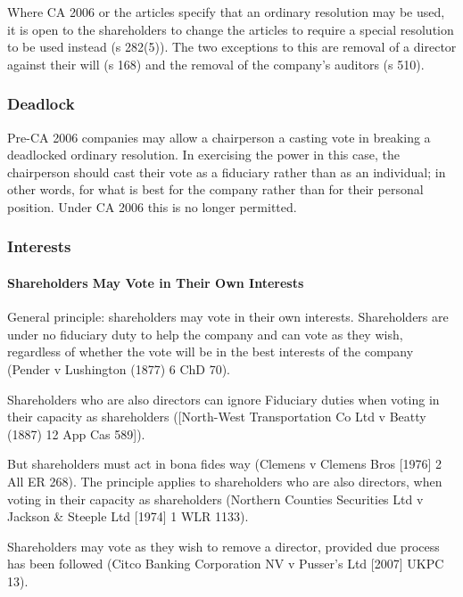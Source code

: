 \documentclass[
]{article}
\begin{document}
Where CA 2006 or the articles specify that an ordinary resolution may be
used, it is open to the shareholders to change the articles to require a
special resolution to be used instead (s 282(5)). The two exceptions to
this are removal of a director against their will (s 168) and the
removal of the company's auditors (s 510).

\hypertarget{deadlock}{%
\subsubsection{Deadlock}\label{deadlock}}

Pre-CA 2006 companies may allow a chairperson a casting vote in breaking
a deadlocked ordinary resolution. In exercising the power in this case,
the chairperson should cast their vote as a fiduciary rather than as an
individual; in other words, for what is best for the company rather than
for their personal position. Under CA 2006 this is no longer permitted.

\hypertarget{interests}{%
\subsubsection{Interests}\label{interests}}

\hypertarget{shareholders-may-vote-in-their-own-interests}{%
\paragraph{Shareholders May Vote in Their Own
Interests}\label{shareholders-may-vote-in-their-own-interests}}

General principle: shareholders may vote in their own interests.
Shareholders are under no fiduciary duty to help the company and can
vote as they wish, regardless of whether the vote will be in the best
interests of the company (Pender v Lushington (1877) 6 ChD 70).

Shareholders who are also directors can ignore Fiduciary duties when
voting in their capacity as shareholders ({[}North-West Transportation
Co Ltd v Beatty (1887) 12 App Cas 589{]}).

But shareholders must act in bona fides way (Clemens v Clemens Bros
{[}1976{]} 2 All ER 268). The principle applies to shareholders who are
also directors, when voting in their capacity as shareholders (Northern
Counties Securities Ltd v Jackson \& Steeple Ltd {[}1974{]} 1 WLR 1133).

Shareholders may vote as they wish to remove a director, provided due
process has been followed (Citco Banking Corporation NV v Pusser's Ltd
{[}2007{]} UKPC 13).
\end{document}

